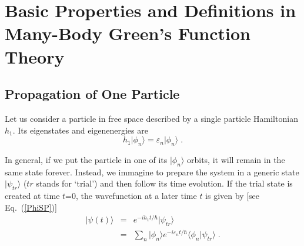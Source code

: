 
\chapter[Basics GF]{Basic Properties and Definitions in Many-Body Green's Function Theory}


\section{Propagation of One Particle}
\label{OnaPartProp}

Let us consider a particle in free space described by a single particle Hamiltonian $h_1$. Its eigenstates  and eigenenergies are
\begin{equation}
h_1 \vert \phi_n \rangle = \varepsilon_n \vert \phi_n \rangle  \; .
\end{equation}

In general, if we put the particle in one of its $\vert \phi_n \rangle$ orbits, it will remain in the same state forever. Instead, we immagine to prepare the system in a generic state $\vert\psi_{tr}\rangle$ ($tr$ stands for `trial') and then follow its time evolution. If the trial state is created at time $t$=0, the wavefunction at a later time $t$ is given by [see Eq.~(\ref{PhiSP})]
\begin{eqnarray}
\vert \psi(t) \rangle &=& e^{- i h_1 t /\hbar} \vert \psi_{tr} \rangle
\nonumber \\
                        &=& \sum_n \vert \phi_n \rangle e^{- i \varepsilon_n t /\hbar} \langle \phi_n \vert \psi_{tr} \rangle \; .
\label{psievol}
\end{eqnarray}

